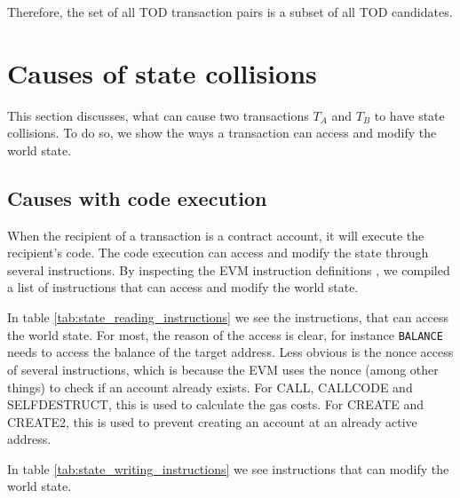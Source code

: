 \documentclass[draft,final]{vutinfth} %
\begin{document}
Therefore, the set of all TOD transaction pairs is a subset of all TOD candidates.

\section{Causes of state collisions}

This section discusses, what can cause two transactions $T_A$ and $T_B$ to have state collisions. To do so, we show the ways a transaction can access and modify the world state.

\subsection{Causes with code execution}

When the recipient of a transaction is a contract account, it will execute the recipient's code. The code execution can access and modify the state through several instructions. By inspecting the EVM instruction definitions \cite[p.30-38]{wood_ethereum_2024}\cite{noauthor_evm_2024}, we compiled a list of instructions that can access and modify the world state.

In table \ref{tab:state_reading_instructions} we see the instructions, that can access the world state. For most, the reason of the access is clear, for instance \verb|BALANCE| needs to access the balance of the target address. Less obvious is the nonce access of several instructions, which is because the EVM uses the nonce (among other things) to check if an account already exists. For CALL, CALLCODE and SELFDESTRUCT, this is used to calculate the gas costs. For CREATE and CREATE2, this is used to prevent creating an account at an already active address. \cite{wood_ethereum_2024}

In table \ref{tab:state_writing_instructions} we see instructions that can modify the world state.
\end{document}
